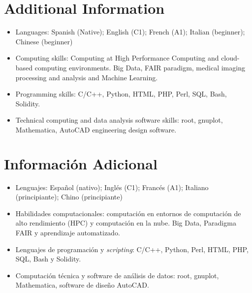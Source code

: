 \ifeng
\section*{Additional Information}

\begin{itemize}
  \item Languages: Spanish (Native); English (C1); French (A1); Italian (beginner); Chinese (beginner)
  \item Computing skills: Computing at High Performance Computing and cloud-based computing environments. Big Data, FAIR paradigm, medical imaging processing and analysis and Machine Learning.
  \item Programming skills: C/C++, Python, HTML, PHP, Perl, SQL, Bash, Solidity.
  \item Technical computing and data analysis software skills: root, gnuplot, Mathematica, AutoCAD engineering design software.
\end{itemize}
\else
\section*{Información Adicional}

\begin{itemize}
\item Lenguajes: Español (nativo); Inglés (C1); Francés (A1); Italiano (principiante); Chino (principiante)
\item Habilidades computacionales: computación en entornos de computación de alto rendimiento (HPC) y computación en la nube. Big Data, Paradigma FAIR y aprendizaje automatizado.
\item Lenguajes de programación y {\emph{scripting}}: C/C++, Python, Perl, HTML, PHP, SQL, Bash y Solidity.
\item Computación técnica y software de análisis de datos: root, gnuplot, Mathematica, software de diseño AutoCAD.
\end{itemize}
\fi